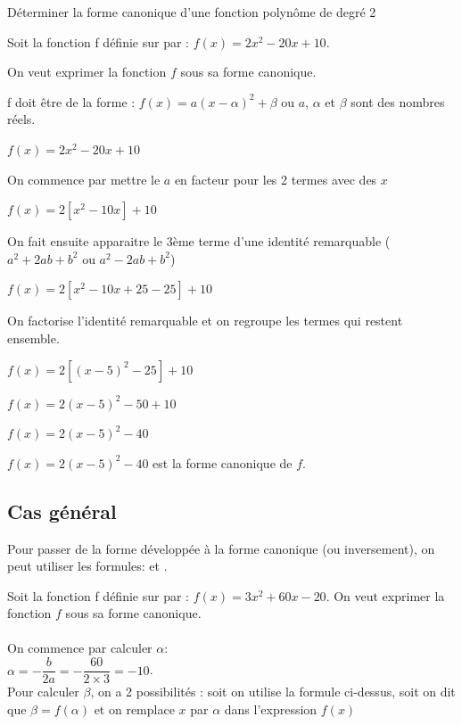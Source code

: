     \begin{bmethodet}{Déterminer la forme canonique d'une fonction polynôme de degré 2}
        
        Soit la fonction f définie sur \R par : $f(x)=2x^2-20x+10$.
        
        On veut exprimer la fonction $f$ sous sa forme canonique.
        
        
        f doit être de la forme : 	
 		$f(x)=a(x-\alpha)^2+\beta$ 	
 		ou $a$, $\alpha$ et $\beta$ sont des nombres réels.
        
        $f(x)=2x^2-20x+10$
        
        On commence par mettre le $a$ en facteur pour les 2 termes avec des $x$
        
        $f(x)=2[x^2-10x]+10$
          
        On fait ensuite apparaitre le 3ème terme d'une identité remarquable ($a^2+2ab+b^2$ ou $a^2-2ab+b^2$)
        
        $f(x)=2[x^2-10x+25-25]+10$
        
        On factorise l'identité remarquable et on regroupe les termes qui restent ensemble.
        
        $f(x)=2[(x-5)^2-25]+10$
        
        $f(x)=2(x-5)^2-50+10$
        
        $f(x)=2(x-5)^2-40$

        $f(x)=2(x-5)^2-40$ est la forme canonique de $f$.
    \end{bmethodet}

	\subsection{Cas général}
	
	\begin{bprop}
		Pour passer de la forme développée à la forme canonique (ou inversement), on peut utiliser les formules:
		 et .
	\end{bprop}

	\begin{bexemple}
		Soit la fonction f définie sur \R par : $f(x)=3x^2+60x-20$.
		On veut exprimer la fonction $f$ sous sa forme canonique.\\
		\ \\
		On commence par calculer $\alpha$:\\
		$\alpha=- \dfrac{b}{2a}=-\dfrac{60}{2\times 3}=-10$.
		\ \\
		Pour calculer $\beta$, on a 2 possibilités : soit on utilise la formule ci-dessus, soit on dit que $\beta=f(\alpha)$ et on remplace $x$ par $\alpha$ dans l'expression $f(x)$
	\end{bexemple}
    


